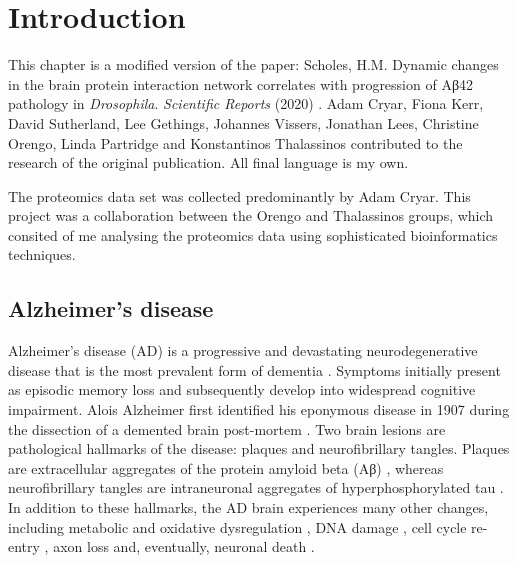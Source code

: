 \section{Introduction}
\label{introduction}

This chapter is a modified version of the paper:
Scholes, H.M. Dynamic changes in the brain protein interaction network correlates with progression of Aβ42 pathology in \textit{Drosophila}. \textit{Scientific Reports} (2020) \cite{Scholes2020a}.
Adam Cryar, Fiona Kerr, David Sutherland, Lee Gethings, Johannes Vissers, Jonathan Lees, Christine Orengo, Linda Partridge and Konstantinos Thalassinos contributed to the research of the original publication.
All final language is my own.

The proteomics data set was collected predominantly by Adam Cryar.
This project was a collaboration between the Orengo and Thalassinos groups, which consited of me analysing the proteomics data using sophisticated bioinformatics techniques.

\subsection{Alzheimer's disease}
\label{sec:Alzheimer's disease}

Alzheimer’s disease (AD) is a progressive and devastating neurodegenerative disease that is the most prevalent form of dementia \cite{Lane2018}.
Symptoms initially present as episodic memory loss and subsequently develop into widespread cognitive impairment.
Alois Alzheimer first identified his eponymous disease in 1907 during the dissection of a demented brain post-mortem \cite{Alzheimer1907}.
Two brain lesions are pathological hallmarks of the disease: plaques and neurofibrillary tangles.
Plaques are extracellular aggregates of the protein amyloid beta (Aβ) \cite{Glenner2012}, whereas neurofibrillary tangles are intraneuronal aggregates of hyperphosphorylated tau \cite{Grundke-Iqbal1986,Goedert1988}.
In addition to these hallmarks, the AD brain experiences many other changes, including metabolic and oxidative dysregulation \cite{Cai2011,Szutowicz2013}, DNA damage \cite{Suberbielle2013}, cell cycle re-entry \cite{Raina1999}, axon loss \cite{Kanaan2013} and, eventually, neuronal death \cite{Szutowicz2013,Donev2009}.

